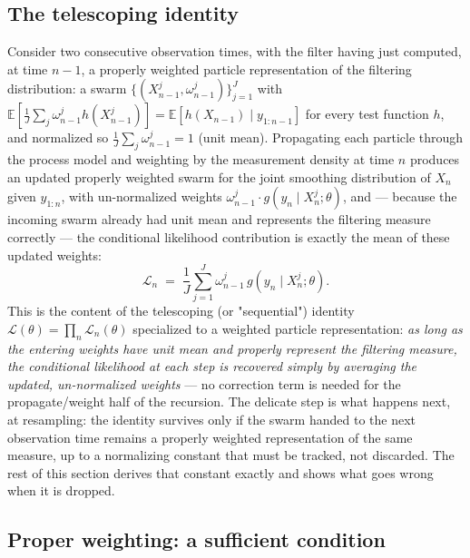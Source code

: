 \documentclass[11pt]{article}
\newcommand{\E}{\mathbb{E}}
\begin{document}
\subsection{The telescoping identity}

Consider two consecutive observation times, with the filter having just
computed, at time $n-1$, a properly weighted particle representation of the
filtering distribution: a swarm $\{(X_{n-1}^j, \omega_{n-1}^j)\}_{j=1}^J$ with
$\E\left[\frac1J\sum_j \omega_{n-1}^j h(X_{n-1}^j)\right] = \E[h(X_{n-1})\mid
y_{1:n-1}]$ for every test function $h$, and normalized so
$\frac1J\sum_j \omega_{n-1}^j = 1$ (unit mean). Propagating each particle
through the process model and weighting by the measurement density at time
$n$ produces an updated properly weighted swarm for the joint smoothing
distribution of $X_n$ given $y_{1:n}$, with un-normalized weights
$\omega_{n-1}^j \cdot g(y_n\mid X_n^j;\theta)$, and — because the incoming
swarm already had unit mean and represents the filtering measure correctly —
the conditional likelihood contribution is exactly the mean of these updated
weights:
\[
\mathcal{L}_n \;=\; \frac1J \sum_{j=1}^J \omega_{n-1}^j\, g(y_n\mid X_n^j;\theta).
\]
This is the content of the telescoping (or "sequential") identity
$\mathcal{L}(\theta)=\prod_n \mathcal{L}_n(\theta)$ specialized to a
weighted particle representation: \emph{as long as the entering weights have
unit mean and properly represent the filtering measure, the conditional
likelihood at each step is recovered simply by averaging the updated,
un-normalized weights} — no correction term is needed for the propagate/weight
half of the recursion. The delicate step is what happens next, at
resampling: the identity survives only if the swarm handed to the next
observation time remains a properly weighted representation of the same
measure, up to a normalizing constant that must be tracked, not discarded.
The rest of this section derives that constant exactly and shows what goes
wrong when it is dropped.

\subsection{Proper weighting: a sufficient condition}
\label{sec:proper-weighting}
\end{document}
